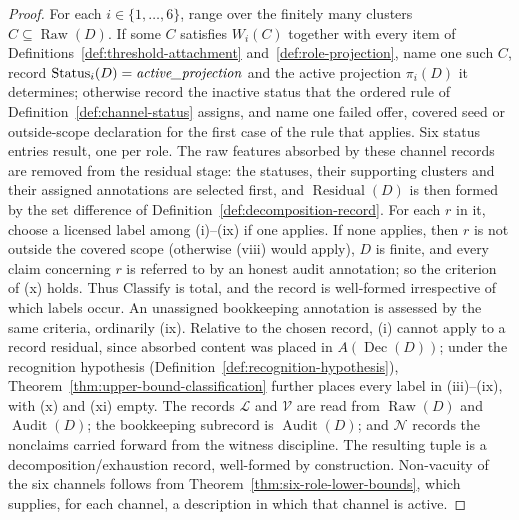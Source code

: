 \documentclass[11pt]{article}
\theoremstyle{definition}
\newcommand{\Raw}[1]{\ensuremath{\operatorname{Raw}\!\left(#1\right)}}
\newcommand{\Audit}[1]{\ensuremath{\operatorname{Audit}\!\left(#1\right)}}
\newcommand{\Dec}[1]{\ensuremath{\operatorname{Dec}\!\left(#1\right)}}
\newcommand{\Residual}[1]{\ensuremath{\operatorname{Residual}\!\left(#1\right)}}
\newcommand{\Status}[2]{\ensuremath{\operatorname{Status}_{#1}\!\left(#2\right)}}
\newcommand{\activeproj}{\textit{active\_\allowbreak projection}}
\begin{document}
\begin{proof}
For each \(i \in \{1,\ldots,6\}\), range over the finitely many clusters
\(C\subseteq\Raw{D}\). If some \(C\) satisfies \(W_i(C)\) together with every
item of Definitions~\ref{def:threshold-attachment}
and~\ref{def:role-projection}, name one such \(C\), record
\(\Status{i}{D} = \activeproj\) and the active projection
\(\pi_i(D)\) it determines; otherwise record the inactive status that the
ordered rule of Definition~\ref{def:channel-status} assigns, and name one
failed offer, covered seed or outside-scope declaration for the first case of
the rule that applies. Six status entries
result, one per role. The raw features absorbed by these channel
records are removed from the residual stage: the statuses, their
supporting clusters and their assigned annotations are selected first, and
\(\Residual{D}\) is then formed by the set difference of
Definition~\ref{def:decomposition-record}. For each \(r\) in it, choose a
licensed label among (i)--(ix) if one applies. If none applies, then \(r\) is
not outside the covered scope (otherwise (viii) would apply), \(D\) is finite,
and every claim concerning \(r\) is referred to by an honest audit annotation; so the criterion of
(x) holds. Thus \(\mathrm{Classify}\) is total, and the record is well-formed
irrespective of which labels occur. An unassigned bookkeeping annotation is
assessed by the same criteria, ordinarily (ix). Relative to the chosen
record, (i) cannot apply to a record residual, since absorbed content was
placed in \(A(\Dec{D})\); under the recognition hypothesis
(Definition~\ref{def:recognition-hypothesis}),
Theorem~\ref{thm:upper-bound-classification} further places every label in
(iii)--(ix), with (x) and (xi) empty. The records \(\mathcal{L}\) and \(\mathcal{V}\) are
read from \(\Raw{D}\) and \(\Audit{D}\); the bookkeeping subrecord is
\(\Audit{D}\); and \(\mathcal{N}\) records the nonclaims carried
forward from the witness discipline. The resulting tuple is a
decomposition/exhaustion record, well-formed by construction.
Non-vacuity of the six channels follows from
Theorem~\ref{thm:six-role-lower-bounds}, which supplies, for each
channel, a description in which that channel is active.
\end{proof}
\end{document}
